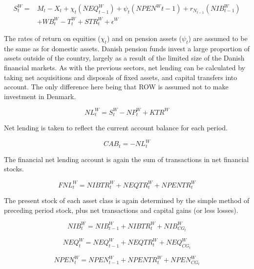 \documentclass[
]{book}
\begin{document}
\begin{equation}
\begin{split}
S^W_t = & M_t - X_t+\chi _t(NEQ^W_{t-1}) + \psi _t(NPEN^W{t-1})+r_{N_{t-1}}(NIB^W_{t-1}) \\
        & + WB^W_t - T^W_t +STR^W_t +\epsilon ^W
\end{split}
\end{equation}

The rates of return on equities (\(\chi _t\)) and on pension assets (\(\psi _t\)) are assumed to be the same as for domestic assets. Danish pension funds invest a large proportion of assets outside of the country, largely as a result of the limited size of the Danish financial markets. As with the previous sectors, net lending can be calculated by taking net acquisitions and disposals of fixed assets, and capital transfers into account. The only difference here being that ROW is assumed not to make investment in Denmark.

\begin{equation}
NL^W_t = S^W_t - NP^W_t + KTR^W
\end{equation}

Net lending is taken to reflect the current account balance for each period.

\begin{equation}
CAB_t = -NL^W_t
\end{equation}

The financial net lending account is again the sum of transactions in net
financial stocks.

\begin{equation}
FNL^W_t = NIBTR^W_t + NEQTR^W_t + NPENTR^W_t
\end{equation}

The present stock of each asset class is again determined by the simple method of
preceding period stock, plus net transactions and capital gains (or less losses).

\begin{equation}
NIB^W_t = NIB^W_{t-1} + NIBTR^W_t + NIB^W_{CG_t}
\end{equation}

\begin{equation}
NEQ^W_t = NEQ^W_{t-1} + NEQTR^W_t + NEQ^W_{CG_t}
\end{equation}

\begin{equation}
NPEN^W_t = NPEN^W_{t-1} + NPENTR^W_t + NPEN^W_{CG_t}
\end{equation}
\end{document}
